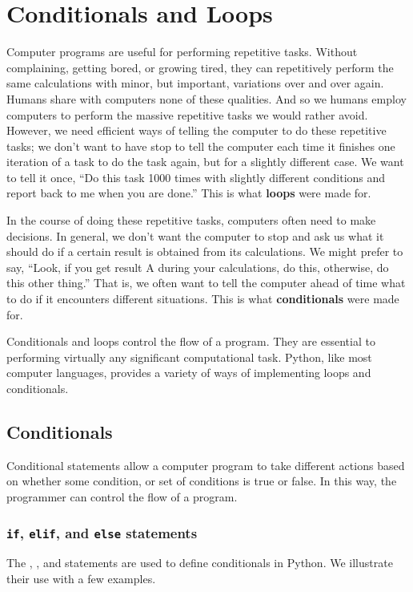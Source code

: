 \documentclass[letterpaper,10pt,english]{sphinxmanual}
\begin{document}
\chapter{Conditionals and Loops}
\label{chap6/chap6_loopsconds:chap6}\label{chap6/chap6_loopsconds:conditionals-and-loops}\label{chap6/chap6_loopsconds::doc}
Computer programs are useful for performing repetitive tasks.  Without complaining, getting bored, or growing tired, they can repetitively perform the same calculations with minor, but important, variations over and over again.  Humans share with computers none of these qualities.  And so we humans employ computers to perform the massive repetitive tasks we would rather avoid. However, we need efficient ways of telling the computer to do these repetitive tasks; we don't want to have stop to tell the computer each time it finishes one iteration of a task to do the task again, but for a slightly different case.  We want to tell it once, ``Do this task 1000 times with slightly different conditions and report back to me when you are done.''  This is what \textbf{loops} were made for.

In the course of doing these repetitive tasks, computers often need to make decisions.  In general, we don't want the computer to stop and ask us what it should do if a certain result is obtained from its calculations.  We might prefer to say,  ``Look, if you get result A during your calculations, do this, otherwise, do this other thing.''  That is, we often want to tell the computer ahead of time what to do if it encounters different situations.  This is what \textbf{conditionals} were made for.

Conditionals and loops control the flow of a program.  They are essential to performing virtually any significant computational task.  Python, like most computer languages, provides a variety of ways of implementing loops and conditionals.


\section{Conditionals}
\label{chap6/chap6_loopsconds:index-0}\label{chap6/chap6_loopsconds:conditionals}
Conditional statements allow a computer program to take different actions based on whether some condition, or set of conditions is true or false.  In this way, the programmer can control the flow of a program.


\subsection{\texttt{if}, \texttt{elif}, and \texttt{else} statements}
\label{chap6/chap6_loopsconds:if-elif-and-else-statements}
The , , and  statements are used to define conditionals in Python.  We illustrate their use with a few examples.
\end{document}
